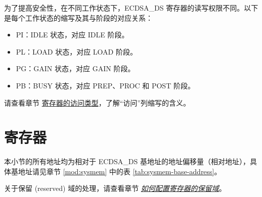 \documentclass[main\_\_CN.tex]{subfiles}
\begin{document}
为了提高安全性，在不同工作状态下，ECDSA\_DS 寄存器的读写权限不同。以下是每个工作状态的缩写及其与阶段的对应关系：

\begin{itemize}
    \item PI：IDLE 状态，对应 IDLE 阶段。
    \item PL：LOAD 状态，对应 LOAD 阶段。
    \item PG：GAIN 状态，对应 GAIN 阶段。
    \item PB：BUSY 状态，对应 PREP、PROC 和 POST 阶段。
\end{itemize}

请查看章节 \hyperref[glossary-access-types]{寄存器的访问类型}，了解“访问”列缩写的含义。






\newpage
\section{寄存器}

本小节的所有地址均为相对于 ECDSA\_DS 基地址的地址偏移量（相对地址），具体基地址请见章节 \ref{mod:sysmem} \textit{} 中的表 \ref{tab:sysmem-base-address}。

关于保留 (reserved) 域的处理，请查看章节 \hyperref[programming-reserved-field]{\textit{如何配置寄存器的保留域}}。


\end{document}
